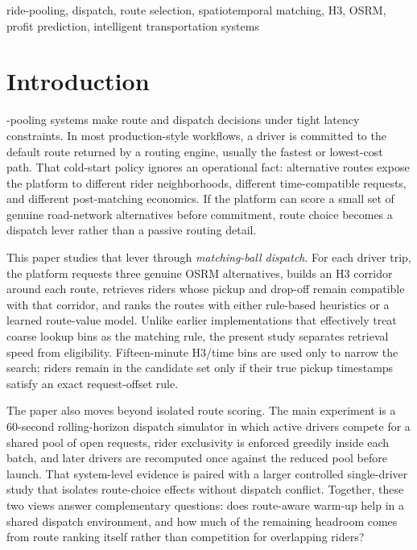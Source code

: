 \documentclass[journal]{IEEEtran}
\begin{document}
\begin{IEEEkeywords}
ride-pooling, dispatch, route selection, spatiotemporal matching, H3, OSRM, profit prediction, intelligent transportation systems
\end{IEEEkeywords}

\section{Introduction}
-pooling systems make route and dispatch decisions under tight latency constraints. In most production-style workflows, a driver is committed to the default route returned by a routing engine, usually the fastest or lowest-cost path. That cold-start policy ignores an operational fact: alternative routes expose the platform to different rider neighborhoods, different time-compatible requests, and different post-matching economics. If the platform can score a small set of genuine road-network alternatives before commitment, route choice becomes a dispatch lever rather than a passive routing detail.

This paper studies that lever through \emph{matching-ball dispatch}. For each driver trip, the platform requests three genuine OSRM alternatives, builds an H3 corridor around each route, retrieves riders whose pickup and drop-off remain compatible with that corridor, and ranks the routes with either rule-based heuristics or a learned route-value model. Unlike earlier implementations that effectively treat coarse lookup bins as the matching rule, the present study separates retrieval speed from eligibility. Fifteen-minute H3/time bins are used only to narrow the search; riders remain in the candidate set only if their true pickup timestamps satisfy an exact request-offset rule.

The paper also moves beyond isolated route scoring. The main experiment is a 60-second rolling-horizon dispatch simulator in which active drivers compete for a shared pool of open requests, rider exclusivity is enforced greedily inside each batch, and later drivers are recomputed once against the reduced pool before launch. That system-level evidence is paired with a larger controlled single-driver study that isolates route-choice effects without dispatch conflict. Together, these two views answer complementary questions: does route-aware warm-up help in a shared dispatch environment, and how much of the remaining headroom comes from route ranking itself rather than competition for overlapping riders?
\end{document}
